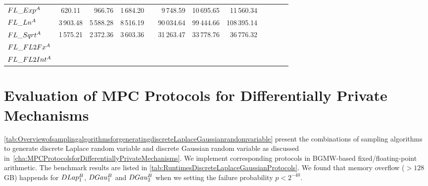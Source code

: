 \begin{table}
{\begin{tabular}{ l c r r r r r r r r r r}
            $FL\_Exp^{A}$                         & 620.11                  & 966.76    & 1\,684.20               &   & 9\,748.59  & 10\,695.65 & 11\,560.34  \\
            $FL\_Ln^{A}$                          & 3\,903.48               & 5\,588.28 & 8\,516.19               &   & 90\,034.64 & 99\,444.66 & 108\,395.14 \\
            $FL\_Sqrt^{A}$                        & 1\,575.21               & 2\,372.36 & 3\,603.36               &   & 31\,263.47 & 33\,778.76 & 36\,776.32  \\
            $FL\_FL2Fx^{A}$                       &                         &           &                         &   &            &            &             \\
            $FL\_FL2Int^{A}$                      &                         &           &                         &   &            &            &             \\
            \bottomrule
        \end{tabular}
    }
\end{table}
\FloatBarrier


\section{Evaluation of MPC Protocols for Differentially Private Mechanisms}
\label{sec:EvaluationofMPCProtocolsforDifferentiallyPrivateMechanisms}

\autoref{tab:OverviewofsamplingalgorithmsforgeneratingdiscreteLaplaceGaussianrandomvariable} present the combinations of sampling algorithms to generate discrete Laplace random variable and discrete Gaussian random variable as discussed in~\autoref{cha:MPCProtocolsforDifferentiallyPrivateMechanisms}. We implement corresponding protocols in BGMW-based fixed/floating-point arithmetic.
The benchmark results are listed in \autoref{tab:RuntimesDiscreteLaplaceGaussianProtocols}.
We found that memory overflow ($>128$ GB) happends for $DLap_1^{B}$, $DGau_1^{B}$ and $DGau_2^{B}$ when we setting the failure probability $p<2^{-40}$.


